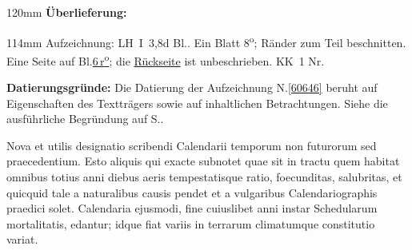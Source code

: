 %
\frenchspacing%
\begin{ledgroupsized}[r]{120mm}%
\footnotesize%
\pstart%
\noindent\textbf{Überlieferung:}%
\pend%
\end{ledgroupsized}%
\begin{ledgroupsized}[r]{114mm}%
\footnotesize%
\pstart%
\parindent -6mm%
%
Aufzeichnung:
LH~I~3,\;8d Bl..
Ein Blatt 8\textsuperscript{o};
Ränder zum Teil beschnitten.
Eine Seite auf Bl.\;\href{\Scan{LH_01_03_08d_006r}}{6\,r\textsuperscript{o}};
die \href{\Scan{LH_01_03_08d_006v}}{Rückseite} ist unbeschrieben.
\newline%
KK~1 Nr.
\pend%
\end{ledgroupsized}%
\vspace{5mm}%
\begin{ledgroup}%
\footnotesize%
\pstart%
\noindent%
\textbf{Datierungsgründe:}
Die Datierung der Aufzeichnung N.\;\ref{60646} beruht auf Eigenschaften des Textträgers sowie auf inhaltlichen Betrachtungen.
Siehe die ausführliche Begründung auf S.\;\pageref{60646_dat}.%
\pend%
\end{ledgroup}%
%
\frenchspacing%
\vspace{8mm}%
\normalsize%
\pstart%
\noindent%
Nova et utilis designatio%
scribendi Calendarii%
temporum non futurorum%
sed praecedentium.%
Esto aliquis
qui exacte subnotet
quae sit in tractu%
quem habitat
omnibus totius anni diebus%
%
aeris tempestatisque ratio,%
%
%
foecunditas,%
salubritas,%
et quicquid tale a naturalibus causis pendet%
%
et a vulgaribus Calendariographis%
praedici solet.
Calendaria ejusmodi,
fine cuiuslibet anni%
instar Schedularum mortalitatis,%
edantur;
idque fiat variis in
terrarum climatumque constitutio variat.%
